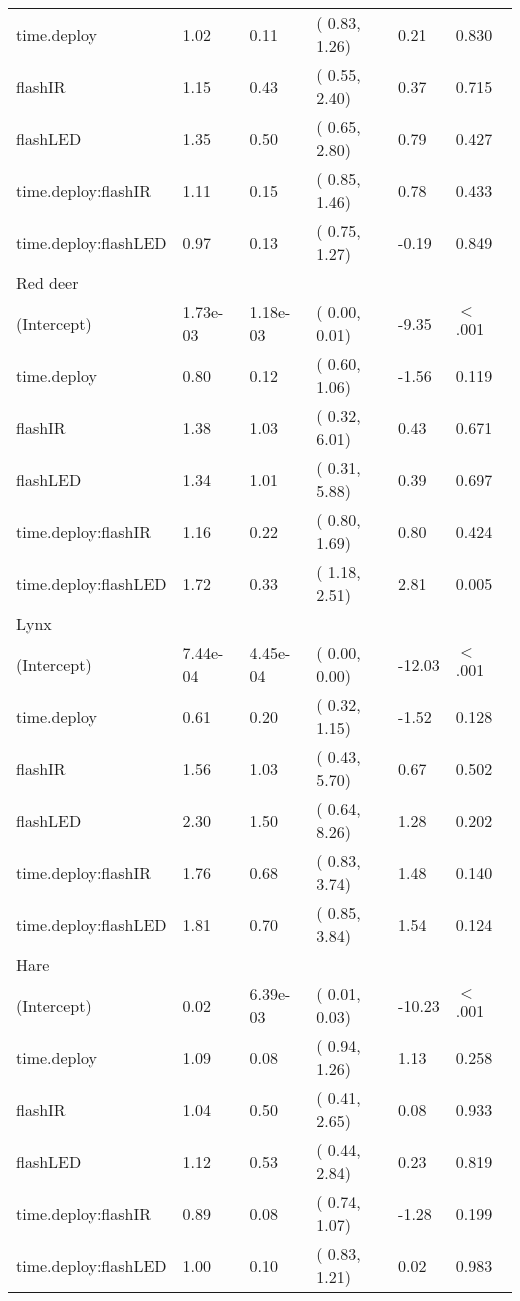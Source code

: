 \begin{table}[ht]
\begin{tabular}{llllll}
  time.deploy & 1.02 & 0.11 & ( 0.83,  1.26) & 0.21 & 0.830  \\ 
  flashIR & 1.15 & 0.43 & ( 0.55,  2.40) & 0.37 & 0.715  \\ 
  flashLED & 1.35 & 0.50 & ( 0.65,  2.80) & 0.79 & 0.427  \\ 
  time.deploy:flashIR & 1.11 & 0.15 & ( 0.85,  1.46) & 0.78 & 0.433  \\ 
  time.deploy:flashLED & 0.97 & 0.13 & ( 0.75,  1.27) & -0.19 & 0.849  \\ 
  Red deer &  &  &  &  &        \\ 
  (Intercept) & 1.73e-03 & 1.18e-03 & ( 0.00,  0.01) & -9.35 & $<$ .001 \\ 
  time.deploy & 0.80 & 0.12 & ( 0.60,  1.06) & -1.56 & 0.119  \\ 
  flashIR & 1.38 & 1.03 & ( 0.32,  6.01) & 0.43 & 0.671  \\ 
  flashLED & 1.34 & 1.01 & ( 0.31,  5.88) & 0.39 & 0.697  \\ 
  time.deploy:flashIR & 1.16 & 0.22 & ( 0.80,  1.69) & 0.80 & 0.424  \\ 
  time.deploy:flashLED & 1.72 & 0.33 & ( 1.18,  2.51) & 2.81 & 0.005  \\ 
  Lynx &  &  &  &  &        \\ 
  (Intercept) & 7.44e-04 & 4.45e-04 & ( 0.00,  0.00) & -12.03 & $<$ .001 \\ 
  time.deploy & 0.61 & 0.20 & ( 0.32,  1.15) & -1.52 & 0.128  \\ 
  flashIR & 1.56 & 1.03 & ( 0.43,  5.70) & 0.67 & 0.502  \\ 
  flashLED & 2.30 & 1.50 & ( 0.64,  8.26) & 1.28 & 0.202  \\ 
  time.deploy:flashIR & 1.76 & 0.68 & ( 0.83,  3.74) & 1.48 & 0.140  \\ 
  time.deploy:flashLED & 1.81 & 0.70 & ( 0.85,  3.84) & 1.54 & 0.124  \\ 
  Hare &  &  &  &  &        \\ 
  (Intercept) & 0.02 & 6.39e-03 & ( 0.01,  0.03) & -10.23 & $<$ .001 \\ 
  time.deploy & 1.09 & 0.08 & ( 0.94,  1.26) & 1.13 & 0.258  \\ 
  flashIR & 1.04 & 0.50 & ( 0.41,  2.65) & 0.08 & 0.933  \\ 
  flashLED & 1.12 & 0.53 & ( 0.44,  2.84) & 0.23 & 0.819  \\ 
  time.deploy:flashIR & 0.89 & 0.08 & ( 0.74,  1.07) & -1.28 & 0.199  \\ 
  time.deploy:flashLED & 1.00 & 0.10 & ( 0.83,  1.21) & 0.02 & 0.983  \\ 

\end{tabular}
\end{table}
